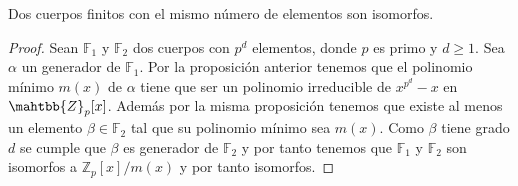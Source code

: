\begin{teorema}
	Dos cuerpos finitos con el mismo número de elementos son isomorfos.
\end{teorema}
\begin{proof}
		Sean $\mathbb{F}_1$ y $\mathbb{F}_2$ dos cuerpos con $p^d$ elementos, donde $p$ es primo y $d\geq 1$. Sea $\alpha$ un generador de $\mathbb{F}_1$. Por la proposición anterior tenemos que el polinomio mínimo $m(x)$ de $\alpha$ tiene que ser un polinomio irreducible de $x^{p^d}-x$ en $\mahtbb{Z}_p[x]$. Además por la misma proposición tenemos que existe al menos un elemento $\beta \in \mathbb{F}_2$ tal que su polinomio mínimo sea $m(x)$. Como $\beta$ tiene grado $d$ se cumple que $\beta$ es generador de $\mathbb{F}_2$ y por tanto tenemos que $\mathbb{F}_1$ y $\mathbb{F}_2$ son isomorfos a $\mathbb{Z}_p[x]/m(x)$ y por tanto isomorfos.
\end{proof}

